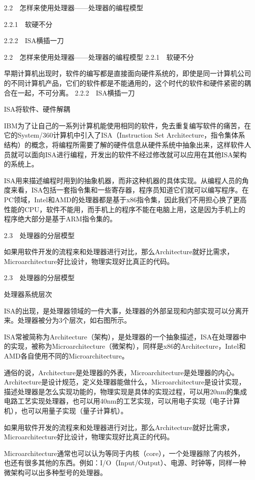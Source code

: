 \documentclass[12pt,UTF8]{ctexbook}
\begin{document}
2.2　怎样来使用处理器——处理器的编程模型

2.2.1　软硬不分

2.2.2　ISA横插一刀


2.2　怎样来使用处理器——处理器的编程模型
2.2.1　软硬不分

早期计算机出现时，软件的编写都是直接面向硬件系统的，即使是同一计算机公司的不同计算机产品，它们的软件都是不能通用的，这个时代的软件和硬件紧密的耦合在一起，不可分离。
2.2.2　ISA横插一刀

ISA将软件、硬件解耦

IBM为了让自己的一系列计算机能使用相同的软件，免去重复编写软件的痛苦，在它的System/360计算机中引入了ISA（Instruction Set Architecture，指令集体系结构）的概念，将编程所需要了解的硬件信息从硬件系统中抽象出来，这样软件人员就可以面向ISA进行编程，开发出的软件不经过修改就可以应用在其他ISA架构的系统上。

ISA用来描述编程时用到的抽象机器，而非这种机器的具体实现。从编程人员的角度来看，ISA包括一套指令集和一些寄存器，程序员知道它们就可以编写程序。在PC领域，Intel和AMD的处理器都是基于x86指令集，因此我们不用担心换了更高性能的CPU，软件不能用，而手机上的程序不能在电脑上用，这是因为手机上的程序绝大部分是基于ARM指令集的。

2.3　处理器的分层模型

如果用软件开发的流程来和处理器进行对比，那么Architecture就好比需求，Microarchitecture好比设计，物理实现好比真正的代码。

2.3　处理器的分层模型

处理器系统层次

ISA的出现，是处理器领域的一件大事，处理器的外部呈现和内部实现可以分离开来。处理器被分为3个层次，如右图所示。

ISA常被简称为Architecture（架构），是处理器的一个抽象描述，ISA在处理器中的实现，被称为Microarchitecture（微架构），同样是x86的Architecture，Intel和AMD各自使用不同的Microarchitecture。

通俗的说，Architecture是处理器的外表，Microarchitecture是处理器的内心。Architecture是设计规范，定义处理器能做什么，Microarchitecture是设计实现，描述处理器是怎么实现功能的，物理实现是具体的实现过程，可以用20nm的集成电路工艺实现处理器，也可以用40nm的工艺实现，可以用电子实现（电子计算机），也可以用量子实现（量子计算机）。

如果用软件开发的流程来和处理器进行对比，那么Architecture就好比需求，Microarchitecture好比设计，物理实现好比真正的代码。

Microarchitecture通常也可以认为等同于内核（core），一个处理器除了内核外，也还有很多其他的东西。例如：I/O（Input/Output）、电源、时钟等，同样一种微架构可以出多种型号的处理器。
\end{document}
